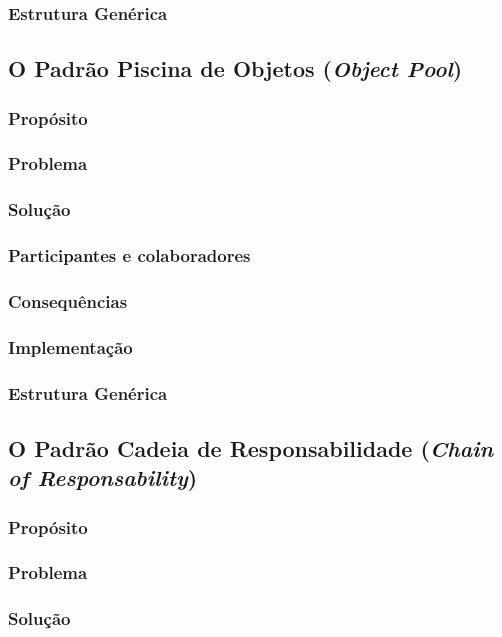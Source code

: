 \documentclass[
	11pt,				%
	openright,
	twoside,			%
	a4paper,			%
	english,			%
	french,
	brazil,				%
	sumario=tradicional
	]{abntex2}
\begin{document}
\subsubsection{Estrutura Genérica}

\subsection{O Padrão Piscina de Objetos (\textit{Object Pool})}
\subsubsection{Propósito}
\subsubsection{Problema}
\subsubsection{Solução}
\subsubsection{Participantes e colaboradores}
\subsubsection{Consequências}
\subsubsection{Implementação}
\subsubsection{Estrutura Genérica}

\subsection{O Padrão Cadeia de Responsabilidade (\textit{Chain of Responsability})}
\subsubsection{Propósito}
\subsubsection{Problema}
\subsubsection{Solução}
\end{document}
